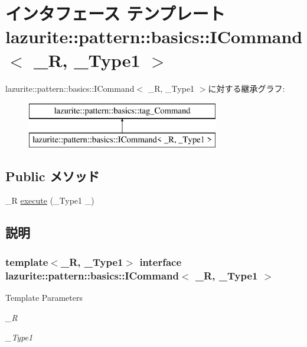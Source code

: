 \hypertarget{interfacelazurite_1_1pattern_1_1basics_1_1_i_command_3_01___r_00_01___type1_01_4}{
\section{インタフェース テンプレート lazurite::pattern::basics::ICommand$<$ \_\-R, \_\-Type1 $>$}
\label{interfacelazurite_1_1pattern_1_1basics_1_1_i_command_3_01___r_00_01___type1_01_4}
}
lazurite::pattern::basics::ICommand$<$ \_\-R, \_\-Type1 $>$に対する継承グラフ:\begin{figure}[H]
\begin{center}
\leavevmode
\includegraphics[height=2cm]{interfacelazurite_1_1pattern_1_1basics_1_1_i_command_3_01___r_00_01___type1_01_4}
\end{center}
\end{figure}
\subsection*{Public メソッド}
\begin{DoxyCompactItemize}
\item 
\_\-R \hyperlink{interfacelazurite_1_1pattern_1_1basics_1_1_i_command_3_01___r_00_01___type1_01_4_a57b174444197a4151eaaa0690c1283ca}{execute} (\_\-Type1 \_)
\end{DoxyCompactItemize}


\subsection{説明}
\subsubsection*{template$<$\_\-R, \_\-Type1$>$ interface lazurite::pattern::basics::ICommand$<$ \_\-R, \_\-Type1 $>$}


\begin{DoxyTemplParams}{Template Parameters}
\item[{\em \_\-R}]\item[{\em \_\-Type1}]\end{DoxyTemplParams}


